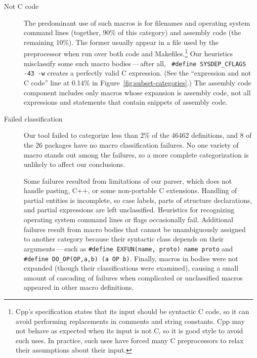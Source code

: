 \documentclass[10pt]{article}
\def\numpackages{26}
\begin{document}
\begin{description}
\item[Not C code]\label{page:not-c-code}
  The predominant use of such macros is for filenames and operating system
  command lines (together, 90\% of this category) and assembly code (the
  remaining 10\%).  The former usually appear in a file used by
  the preprocessor when run over both code and Makefiles.\footnote{Cpp's
    specification states that its input should be syntactic C code, so it
    can avoid performing replacements in comments and string constants.
    Cpp may not behave as expected when its input is not C, so it is good
    style to avoid such uses.  In practice, such uses have forced many C
    preprocessors to relax their assumptions about their input.}  Our
  heuristics misclassify some such macro bodies\,---\,after all, {\tt
  \#define \verb|SYSDEP_CFLAGS| -43 -w} creates a perfectly valid C
expression.  (See the ``expression and not C code'' line at 0.14\% in
Figure~\ref{fig:subset-categories}.)  The assembly code component includes
only macros whose expansion is assembly code, not all expressions and
statements that contain snippets of assembly code.

\item[Failed classification]
  Our tool failed to categorize less than 2\% of the 46462 definitions, and
  8 of the {\numpackages} packages have no macro classification failures.
  No one variety of macro stands out among the failures, so a more complete
  categorization is unlikely to affect our conclusions.
  
  Some failures resulted from limitations of our parser, which does not
  handle pasting, C++, or some
  non-portable C extensions.  Handling of partial entities is incomplete,
  so case labels, parts of structure declarations, and partial expressions
  are left unclassified.  Heuristics for recognizing operating system
  command lines or flags occasionally fail.  Additional failures result
  from macro bodies that cannot be unambiguously assigned to another
  category because their syntactic class depends on their
  arguments\,---\,such as {\tt \#define EXFUN(name, proto) name proto} and
  {\tt \#define
\verb|DO_OP|(OP,a,b) (a OP b)}.  Finally, macros in bodies were not
expanded (though their classifications were examined), causing a small
amount of cascading of failures when complicated or unclassified macros
appeared in other macro definitions.

\end{description}
\end{document}
